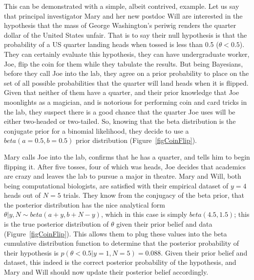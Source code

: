 \documentclass[letterpaper,12pt]{article}
\begin{document}
\begin{linenumbers}
This can be demonstrated with a simple, albeit contrived, example.
Let us say that principal investigator Mary and her new postdoc Will are
interested in the hypothesis that the mass of George Washington's periwig
renders the quarter dollar of the United States unfair.
That is to say their null hypothesis is that the probability of a US
quarter landing heads when tossed is less than 0.5 ($\theta < 0.5$).
They can certainly evaluate this hypothesis, they can have undergraduate
worker, Joe, flip the coin for them while they tabulate the results.
But being Bayesians, before they call Joe into the lab, they agree on a
prior probability to place on the set of all possible probabilities that
the quarter will land heads when it is flipped.
Given that neither of them have a quarter, and their prior knowledge that Joe
moonlights as a magician, and is notorious for performing coin and card tricks
in the lab, they suspect there is a good chance that the quarter Joe uses will
be either two-headed or two-tailed.
So, knowing that the beta distribution is the conjugate prior for a binomial
likelihood, they decide to use a $beta(a=0.5, b=0.5)$ prior distribution
(Figure~\ref{figCoinFlip}).

Mary calls Joe into the lab, confirms that he has a quarter, and tells him to
begin flipping it.
After five tosses, four of which was heads, Joe decides that academics are
crazy and leaves the lab to pursue a major in theatre.  Mary and Will, both
being computational biologists, are satisfied with their
empirical dataset of $y = 4$ heads out of $N = 5$ trials.
They know from the conjugacy of the beta prior, that the posterior distribution
has the nice analytical form $\theta|y,N \sim beta(a + y, b + N - y)$, which
in this case is simply $beta(4.5, 1.5)$; this is the true posterior distribution
of $\theta$ given their prior belief and data (Figure~\ref{figCoinFlip}).
This allows them to plug these values into the beta cumulative distribution
function to determine that the posterior probability of their hypothesis is
$p(\theta < 0.5 | y=1, N=5) = 0.088$.
Given their prior belief and dataset, this indeed is the correct posterior
probability of the hypothesis, and Mary and Will should now update their
posterior belief accordingly.


\end{linenumbers}
\end{document}
